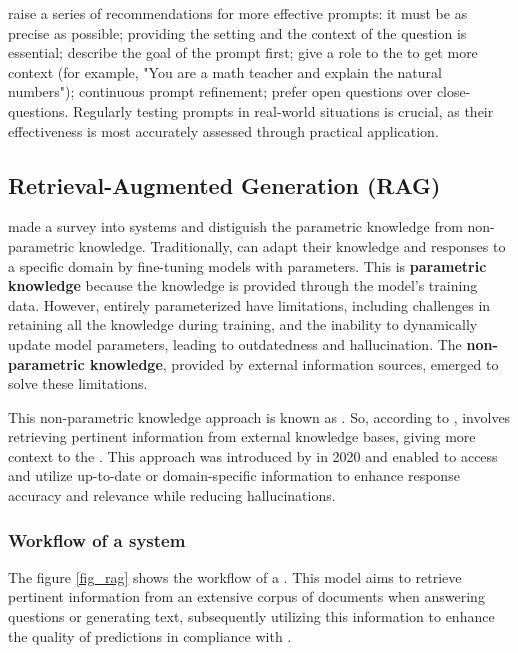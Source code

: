 \citet{mesko_prompt_2023} raise a series of recommendations for more effective {\llm} prompts: it must be as precise as possible; providing the setting and the context of the question is essential; describe the goal of the prompt first; give a role to the {\llm} to get more context (for example, "You are a math teacher and explain the natural numbers"); continuous {\llm} prompt refinement; prefer open questions over close-questions. Regularly testing prompts in real-world situations is crucial, as their effectiveness is most accurately assessed through practical application.


\subsection{Retrieval-Augmented Generation (RAG)}

\citet{gao_retrieval-augmented_2023} made a survey into {\rag} systems and distiguish the parametric knowledge from non-parametric knowledge. Traditionally, {\llm} can adapt their knowledge and responses to a specific domain by fine-tuning models with parameters. This is \textbf{parametric knowledge} because the {\llm} knowledge is provided through the model's training data. However, entirely parameterized {\llm} have limitations, including challenges in retaining all the knowledge during training, and the inability to dynamically update model parameters, leading to outdatedness and hallucination. The \textbf{non-parametric knowledge}, provided by external information sources, emerged to solve these limitations.

This non-parametric knowledge approach is known as {\rag}. So, according to \citet{gao_retrieval-augmented_2023}, {\rag} involves retrieving pertinent information from external knowledge bases, giving more context to the {\llm}. This approach was introduced by \citet{lewis_retrieval-augmented_2020} in 2020 and enabled {\llm} to access and utilize up-to-date or domain-specific information to enhance response accuracy and relevance while reducing hallucinations.


\subsubsection{Workflow of a {\rag} system}

The figure \ref{fig_rag} shows the workflow of a {\rag}. This model aims to retrieve pertinent information from an extensive corpus of documents when answering questions or generating text, subsequently utilizing this information to enhance the quality of predictions in compliance with \citet{lewis_retrieval-augmented_2020}.


